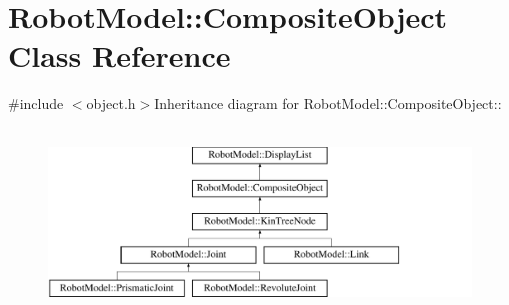 \hypertarget{class_robot_model_1_1_composite_object}{
\section{RobotModel::CompositeObject Class Reference}
\label{class_robot_model_1_1_composite_object}
}


{\ttfamily \#include $<$object.h$>$}Inheritance diagram for RobotModel::CompositeObject::\begin{figure}[H]
\begin{center}
\leavevmode
\includegraphics[height=4.96454cm]{class_robot_model_1_1_composite_object}
\end{center}
\end{figure}
